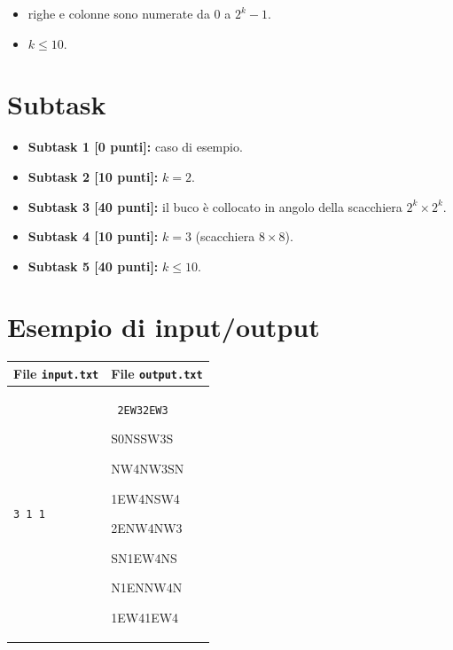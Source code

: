 \documentclass[a4paper,11pt]{article}
\newcommand{\file}[1]{\texttt{#1}}
\newcommand{\esempio}[2]{
\noindent\begin{minipage}{\textwidth}
\begin{tabular}{|p{11cm}|p{5cm}|}
	\hline
	\textbf{File \file{input.txt}} & \textbf{File \file{output.txt}}\\
	\hline
	\tt \small #1 &
	\tt \small #2 \\
	\hline
\end{tabular}
\end{minipage}
}
\begin{document}
\begin{itemize}
   \item righe e colonne sono numerate da $0$ a $2^k -1$.  
   \item $k\leq 10$.
\end{itemize}

\section*{Subtask}
\begin{itemize}
\item \textbf{Subtask 1 [0 punti]:} caso di esempio.
\item \textbf{Subtask 2 [10 punti]:} $k = 2$.
\item \textbf{Subtask 3 [40 punti]:} il buco \`e collocato in angolo della scacchiera $2^k\times 2^k$.
\item \textbf{Subtask 4 [10 punti]:} $k = 3$ (scacchiera $8\times 8$).
\item \textbf{Subtask 5 [40 punti]:} $k \leq 10$.
\end{itemize}

\section*{Esempio di input/output}
\esempio{3 1 1}{\scriptsize
2EW32EW3

S0NSSW3S

NW4NW3SN

1EW4NSW4

2ENW4NW3

SN1EW4NS

N1ENNW4N

1EW41EW4
}
\end{document}
